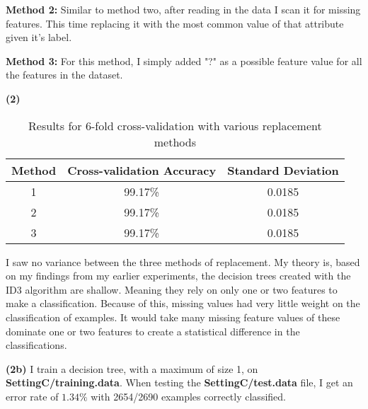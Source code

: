 \documentclass[11pt]{article}
\renewcommand\part[1]{\vspace{.10in}\textbf{(#1)}}
\begin{document}
	\textbf{Method 2:} Similar to method two, after reading in the data I scan it for missing features. This time replacing it with the most common value of that attribute given it's label.
	
	\textbf{Method 3:} For this method, I simply added "?" as a possible feature value for all the features in the dataset.

\part{2}
\begin{table}[H]
\centering
\begin{tabular}{| c | c | c |}
\hline
Method & Cross-validation Accuracy & Standard Deviation\\
\hline
1 & 99.17\% & 0.0185\\
2 & 99.17\% & 0.0185\\
3 & 99.17\% & 0.0185\\
\hline
\end{tabular}
\caption{Results for 6-fold cross-validation with various replacement methods}
\end{table}
I saw no variance between the three methods of replacement. My theory is, based on my findings from my earlier experiments, the decision trees created with the ID3 algorithm are shallow. Meaning they rely on only one or two features to make a classification. Because of this, missing values had very little weight on the classification of examples. It would take many missing feature values of these dominate one or two features to create a statistical difference in the classifications.

\part{2b} I train a decision tree, with a maximum of size 1, on \textbf{SettingC/training.data}. When testing the \textbf{SettingC/test.data} file, I get an error rate of $1.34\%$ with 2654/2690 examples correctly classified.

\end{document}
